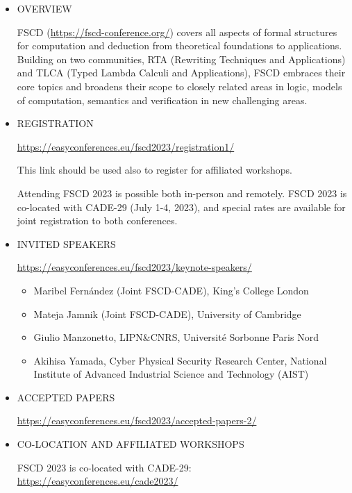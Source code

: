 \documentclass[prodmode,acmtecs]{acmsmall} %
\begin{document}
\begin{itemize}\item  OVERVIEW 
 
  FSCD (\href{https://fscd-conference.org/}{https://fscd-conference.org/}) covers all aspects of formal structures for computation and deduction from theoretical foundations to applications. Building on two communities, RTA (Rewriting Techniques and Applications) and TLCA (Typed Lambda Calculi and Applications), FSCD embraces their core topics and broadens their scope to closely related areas in logic, models of computation, semantics and verification in new challenging areas. 
 
\item  REGISTRATION 
 
  \href{https://easyconferences.eu/fscd2023/registration1/}{https://easyconferences.eu/fscd2023/registration1/} 
 
  This link should be used also to register for affiliated workshops. 
 
  Attending FSCD 2023 is possible both in-person and remotely. FSCD 2023 is co-located with CADE-29 (July 1-4, 2023), and special rates are available for joint registration to both conferences. 
 
\item  INVITED SPEAKERS 
 
  \href{https://easyconferences.eu/fscd2023/keynote-speakers/}{https://easyconferences.eu/fscd2023/keynote-speakers/} 
 
\begin{itemize}\item  Maribel Fernández (Joint FSCD-CADE), King’s College London
\item  Mateja Jamnik (Joint FSCD-CADE), University of Cambridge
\item  Giulio Manzonetto, LIPN\&CNRS, Université Sorbonne Paris Nord
\item  Akihisa Yamada, Cyber Physical Security Research Center, National Institute of Advanced Industrial Science and Technology (AIST)
\end{itemize} 
\item  ACCEPTED PAPERS  
 
  \href{https://easyconferences.eu/fscd2023/accepted-papers-2/}{https://easyconferences.eu/fscd2023/accepted-papers-2/} 
 
\item  CO-LOCATION AND AFFILIATED WORKSHOPS 
 
  FSCD 2023 is co-located with CADE-29: \href{https://easyconferences.eu/cade2023/}{https://easyconferences.eu/cade2023/} 
 

\end{itemize}
\end{document}
